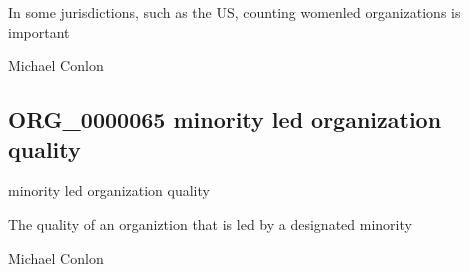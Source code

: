 \documentclass[letterpaper,10pt,english]{sphinxmanual}
\begin{document}
\begin{sphinxShadowBox}

\sphinxAtStartPar
In some jurisdictions, such as the US, counting women\sphinxhyphen{}led organizations is important
\end{sphinxShadowBox}

\begin{sphinxShadowBox}

\sphinxAtStartPar
Michael Conlon 
\end{sphinxShadowBox}
\begin{quote}

\ignorespaces \end{quote}


\subsection{ORG\_0000065 \sphinxhyphen{} minority led organization quality}
\label{\detokenize{doc-ORG_0000065:org-0000065-minority-led-organization-quality}}\label{\detokenize{doc-ORG_0000065:index-0}}\label{\detokenize{doc-ORG_0000065::doc}}
\begin{sphinxShadowBox}

\sphinxAtStartPar
minority led organization quality
\end{sphinxShadowBox}

\begin{sphinxShadowBox}

\sphinxAtStartPar
{\hyperref[\detokenize{doc-BFO_0000019::doc}]{}}
\end{sphinxShadowBox}

\begin{sphinxShadowBox}

\sphinxAtStartPar
The quality of an organiztion that is led by a designated minority
\end{sphinxShadowBox}

\begin{sphinxShadowBox}

\sphinxAtStartPar
Michael Conlon 
\end{sphinxShadowBox}
\end{document}
